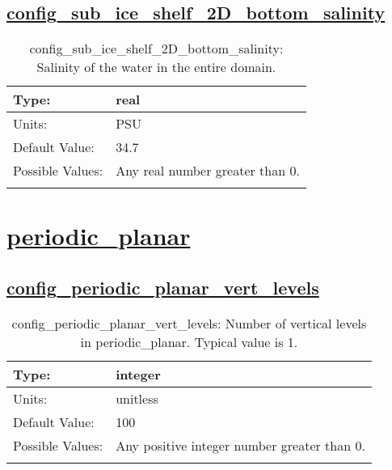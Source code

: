 \subsection[config\_sub\_ice\_shelf\_2D\_bottom\_salinity]{\hyperref[sec:nm_tab_sub_ice_shelf_2D]{config\_sub\_ice\_shelf\_2D\_bottom\_salinity}}
\label{subsec:nm_sec_config_sub_ice_shelf_2D_bottom_salinity}
\begin{center}
\begin{longtable}{| p{2.0in} || p{4.0in} |}
    \hline
    Type: & real \\
    \hline
    Units: & \si{PSU} \\
    \hline
    Default Value: & 34.7 \\
    \hline
    Possible Values: & Any real number greater than 0. \\
    \hline
    \caption{config\_sub\_ice\_shelf\_2D\_bottom\_salinity: Salinity of the water in the entire domain.}
\end{longtable}
\end{center}
\section[periodic\_planar]{\hyperref[sec:nm_tab_periodic_planar]{periodic\_planar}}
\label{sec:nm_sec_periodic_planar}
\subsection[config\_periodic\_planar\_vert\_levels]{\hyperref[sec:nm_tab_periodic_planar]{config\_periodic\_planar\_vert\_levels}}
\label{subsec:nm_sec_config_periodic_planar_vert_levels}
\begin{center}
\begin{longtable}{| p{2.0in} || p{4.0in} |}
    \hline
    Type: & integer \\
    \hline
    Units: & \si{unitless} \\
    \hline
    Default Value: & 100 \\
    \hline
    Possible Values: & Any positive integer number greater than 0. \\
    \hline
    \caption{config\_periodic\_planar\_vert\_levels: Number of vertical levels in periodic\_planar. Typical value is 1.}
\end{longtable}
\end{center}
